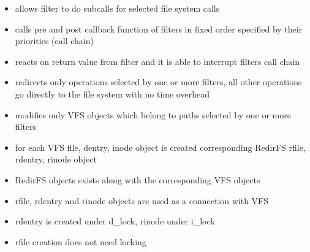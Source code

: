 \documentclass[30pt,a4paper,landscape,headrule,footrule]{foils}
\begin{document}
\foilhead[-2cm]{}
\begin{itemize}
\item allows filter to do subcalls for selected file system calls
\item calls pre and post callback function of filters in fixed order specified
by their priorities (call chain)
\item reacts on return value from filter and it is able to interrupt filters
call chain
\item redirects only operations selected by one or more filters, all other
operations go directly to the file system with no time overhead
\item modifies only VFS objects which belong to paths selected by one or more
filters
\end{itemize}


\begin{itemize}
\item for each VFS file, dentry, inode object is created corresponding RedirFS
rfile, rdentry, rinode object
\item RedirFS objects exists along with the corresponding VFS objects
\item rfile, rdentry and rinode objects are used as a connection with VFS
\item rdentry is created under d\_lock, rinode under i\_lock
\item rfile creation does not need locking
\end{itemize}
\end{document}
